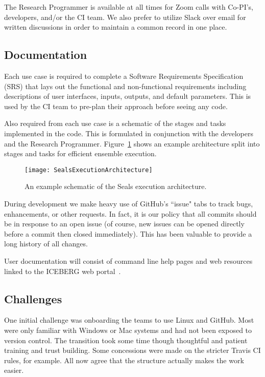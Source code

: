 \documentclass[manuscript,screen]{acmart}
\begin{document}
The Research Programmer is available at all times for Zoom calls with 
Co-PI's, developers, and/or the CI team.  We also prefer to utilize Slack
over email for written discussions in order to maintain a common record
in one place.

\subsection{Documentation}
Each use case is required to complete a Software Requirements Specification (SRS) that lays out the functional and non-functional requirements including descriptions of user interfaces, inputs, outputs, and default parameters.
This is used by the CI team to pre-plan their approach before seeing any code.

Also required from each use case is a schematic of the stages and tasks
implemented in the code. This is formulated in conjunction with the developers and the Research Programmer. 
Figure~\ref{fig:sealsarch} shows an example architecture split into stages and tasks for efficient ensemble execution.

\begin{figure}[h]
	\centering
	\texttt{[image: SealsExecutionArchitecture]}
	\caption{An example schematic of the Seals execution architecture.}
	\label{fig:sealsarch}
\end{figure}

During development we make heavy use of GitHub's ``issue" tabs to track bugs, enhancements, or other requests.  In fact, it is our policy that all 
commits should be in response to an open issue (of course, new issues can be opened directly before a commit then closed immediately).  This has been valuable to provide a long history of all changes.

User documentation will consist of command line help pages and web resources
linked to the ICEBERG web portal~\cite{icebergweb:20}.

\subsection{Challenges}
One initial challenge was onboarding the teams to use Linux and GitHub.  
Most were only familiar with Windows or Mac systems and had not been 
exposed to version control.  The transition took some time though thoughtful and patient training and trust building.  Some concessions were made on the stricter Travis CI
rules, for example.  All now agree that the structure actually makes the work easier.
\end{document}
